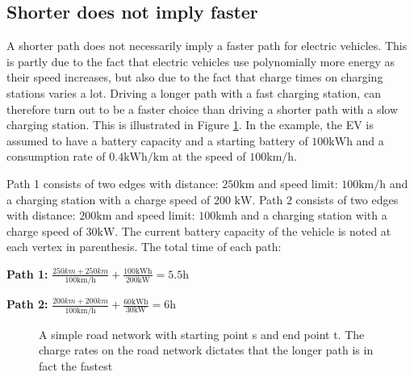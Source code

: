 \subsection{Shorter does not imply faster}
\label{sec:shorternotfaster}
A shorter path does not necessarily imply a faster path for electric vehicles. This is partly due to the fact that electric vehicles use polynomially more energy as their speed increases, but also due to the fact that charge times on charging stations varies a lot. Driving a longer path with a fast charging station, can therefore turn out to be a faster choice than driving a shorter path with a slow charging station. This is illustrated in Figure \ref{fig:simpleroad-network}. In the example, the EV is assumed to have a battery capacity and a starting battery of $100 \si{\kWh}$ and a consumption rate of $0.4\si{\kWh\per\km}$ at the speed of $100 \si{\km\per\hour}$.

Path 1 consists of two edges with distance: $ 250 \si{\km}$ and speed limit: $100 \si{\km\per\hour}$
and a charging station with a charge speed of 200 $\si{\kW}$. Path 2 consists of two edges with distance: $200 \si{\km}$ and speed limit: $100 \si{\km\hour}$ and a charging station with a charge speed of $30\si{\kW}$. The current battery capacity of the vehicle is noted at each vertex in parenthesis. The total time of each path:
				
\textbf{Path 1:} $\frac{250\si{km} + 250\si{km}}{100\si{\km\per\hour}} + \frac{100\si{\kWh}}{200\si{\kW}} = 5.5\si{\hour}$

\textbf{Path 2:} $\frac{200\si{km} + 200\si{km}}{100 \si{\km\per\hour}} + \frac{60\si{\kWh}}{30\si{\kW}} = 6\si{\hour}$


\begin{figure}
\centering
{}
\caption{A simple road network with starting point s and end point t. The charge rates on the road network dictates that the longer path is in fact the fastest}
\label{fig:simpleroad-network}
\end{figure}